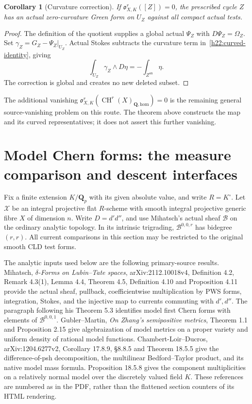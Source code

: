 \documentclass[11pt,a4paper]{article}
\newtheorem{corollary}[theorem]{Corollary}
\theoremstyle{definition}
\theoremstyle{remark}
\begin{document}
\begin{corollary}[Curvature correction]
\label{h22:correction}
If $\mathfrak o^r_{X,K}([Z])=0$, the prescribed cycle $Z$ has an actual
zero-curvature Green form on $U_Z$ against all compact actual tests.
\end{corollary}
\begin{proof}
The definition of the quotient supplies a global actual $\Psi_Z$ with
$D\Psi_Z=\Omega_Z$. Set $\gamma_Z=G_Z-\Psi_Z|_{U_Z}$. Actual Stokes
subtracts the curvature term in~\eqref{h22:curved-identity}, giving
\[
          \int_{U_Z}\gamma_Z\wedge D\eta=-\int_{Z^{\mathrm{an}}}\eta.
\]
The correction is global and creates no new deleted subset.
\end{proof}

The additional vanishing
$\mathfrak o^r_{X,K}(\operatorname{CH}^r(X)_{\mathbf Q,\mathrm{hom}})=0$
is the remaining general source-vanishing problem on this route.
The theorem above constructs the map and its curved representatives;
it does not assert this further vanishing.


\section{Model Chern forms: the measure comparison and descent interfaces}
\label{h22c:section}

Fix a finite extension $K/\mathbf Q_p$ with its given absolute value, and
write $R=K^\circ$.  Let $\mathcal X$ be an integral projective flat
$R$-scheme with smooth integral projective generic fibre $X$ of dimension
$n$.  Write $D=d'd''$, and use Mihatsch's actual sheaf $\mathcal B$ on the
ordinary analytic topology.  In its intrinsic trigrading,
$\mathcal B^{0,0,r}$ has bidegree $(r,r)$.  All current comparisons in this
section may be restricted to the original smooth CLD test forms.

The analytic inputs used below are the following primary-source results.
Mihatsch, \emph{$\delta$-Forms on Lubin--Tate spaces},
arXiv:2112.10018v4, Definition 4.2, Remark 4.3(1), Lemma 4.4,
Theorem 4.5, Definition 4.10 and Proposition 4.11 provide the actual
sheaf, pullback, coefficientwise multiplication by PWS forms, integration,
Stokes, and the injective map to currents commuting with $d',d''$.
The paragraph following his Theorem 5.3 identifies model first Chern
forms with elements of $\mathcal B^{0,0,1}$.
Gubler--Martin, \emph{On Zhang's semipositive metrics}, Theorem 1.1 and
Proposition 2.15 give algebraization of model metrics on a proper
variety and uniform density of rational model functions.
Chambert-Loir--Ducros, arXiv:1204.6277v2, Corollary 17.8.9,
\S8.8.5 and Theorem 18.5.5 give the difference-of-psh decomposition,
the multilinear Bedford--Taylor product, and its native model mass
formula.  Proposition 18.5.8 gives the component multiplicities on a
relatively normal model over the discretely valued field $K$.
These references are numbered as in the PDF, rather than the flattened
section counters of its HTML rendering.
\end{document}
